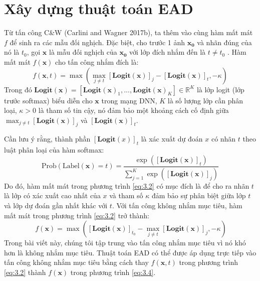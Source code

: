 \section{Xây dựng thuật toán EAD}

Từ tấn công C\&W (Carlini and Wagner 2017b), ta thêm vào cùng hàm mất mát $f$ để sinh 
ra các mẫu đối nghịch. Đặc biệt, cho trước 1 ảnh $\mathbf{x_0}$ và nhãn đúng của nó là $t_0$, 
gọi $\mathbf{x}$ là mẫu đối nghịch của $\mathbf{x_0}$ với lớp đích nhắm đến là $t \neq t_0$ . Hàm mất mát 
$f(\mathbf{x})$ cho tấn công nhắm đích là:
\begin{equation}
    \label{eq:3.2}
    f(\mathbf{x}, t) = \max { \left( \max_{j \neq t} [\textbf{Logit}(\mathbf{x})]_j - 
    [\textbf{Logit}(\mathbf{x})]_t, -\kappa \right) }
\end{equation}
Trong đó $\textbf{Logit}(\mathbf{x}) = [\textbf{Logit}(\mathbf{x})_1, ..., 
\textbf{Logit}(\mathbf{x})_K] 
\in \mathbb{R}^K$ là lớp logit (lớp trước softmax) biểu diễn cho $\mathbf{x}$ trong mạng DNN, $K$
là số lượng lớp cần phân loại, $\kappa > 0$ là tham số tin cậy, nó đảm bảo một khoảng 
cách cố định giữa $\max_{j \neq t} [\textbf{Logit}(\mathbf{x})]_j$ và $[\textbf{Logit}(\mathbf{x})]_t$. 

Cần lưu ý rằng, thành phần $[\textbf{Logit}(x)]_t$ là xác xuất dự đoán $x$ có nhãn $t$ theo 
luật phân loại của hàm softmax:
\begin{equation}
    \label{eq:3.3}
    \text{Prob}(\text{Label}(\mathbf{x}) = t) = \frac{\exp([\textbf{Logit}(\mathbf{x})]_t)}{
        \sum_{j=1}^{K} \exp([\textbf{Logit}(\mathbf{x})]_j)
    }
\end{equation}
Do đó, hàm mất mát trong phương trình \ref{eq:3.2} có mục đích là để cho ra nhãn $t$ là 
lớp có xác xuất cao nhất của $x$ và tham số $\kappa$ đảm bảo sự phân biệt giữa lớp $t$
và lớp dự đoán gần nhất khác với $t$. Với tấn công không nhắm mục tiêu, hàm mất mát trong 
phương trình \ref{eq:3.2} trở thành:
\begin{equation}
    \label{eq:3.4}\
    f(\mathbf{x}) = \max { \left([\textbf{Logit}(\mathbf{x})]_{t_0} - 
    \max_{j \neq t} [\textbf{Logit}(\mathbf{x})]_j, -\kappa \right) }
\end{equation}
Trong bài viết này, chúng tôi tập trung vào tấn công nhắm mục tiêu vì nó khó hơn là không 
nhắm mục tiêu. Thuật toán EAD có thể được áp dụng trực tiếp vào tấn công không nhắm mục 
tiêu bằng cách thay $f(\mathbf{x},t)$ trong phương trình \ref{eq:3.2} thành $f(\mathbf{x})$ trong phương 
trình \ref{eq:3.4}. 

